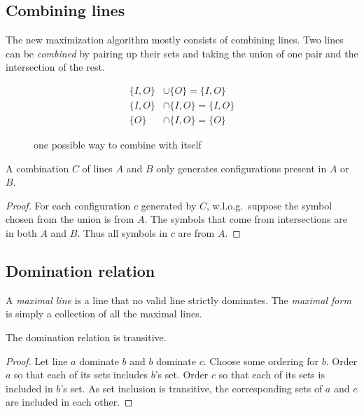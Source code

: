 \documentclass[english, 12pt, a4paper, sci, a-1b, online]{aaltothesis}
\begin{document}
\subsection{Combining lines}

The new maximization algorithm mostly consists of combining lines. Two lines can be \emph{combined} by pairing up their sets and taking the union of one pair and the intersection of the rest.

\begin{figure}[h]
\begin{align*}
  \{I,O\} &\cup \{O\} = \{I, O\} \\
  \{I,O\} &\cap \{I,O\} = \{I, O\} \\
  \{O\} &\cap \{I, O\} = \{O\}
\end{align*}
\caption{one possible way to combine  with itself}
\end{figure}

\begin{theorem}
\label{sound}
A combination $C$ of lines $A$ and $B$ only generates configurations present in $A$ or $B$.
\end{theorem}

\begin{proof}
For each configuration $c$ generated by $C$, w.l.o.g.\ suppose the symbol chosen from the union is from $A$. The symbols that come from intersections are in both $A$ and $B$. Thus all symbols in $c$ are from $A$.
\end{proof}

\subsection{Domination relation}

A \emph{maximal line} is a line that no valid line strictly dominates. The \emph{maximal form} is simply a collection of all the maximal lines.

\begin{lemma}\label{domtrans}
The domination relation is transitive.
\end{lemma}

\begin{proof}
Let line $a$ dominate $b$ and $b$ dominate $c$. Choose some ordering for $b$. Order $a$ so that each of its sets includes $b$'s set. Order $c$ so that each of its sets is included in $b$'s set. As set inclusion is transitive, the corresponding sets of $a$ and $c$ are included in each other.
\end{proof}
\end{document}
